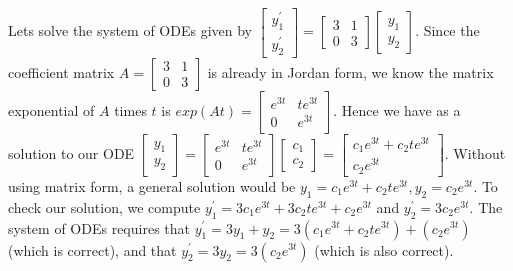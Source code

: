 \documentclass[10pt]{article}
\theoremstyle{plain}
\theoremstyle{box}
\begin{document}
Lets solve the system of ODEs given by  
$
\begin{bmatrix}
y_1^\prime\\
y_2^\prime
\end{bmatrix}
=
\begin{bmatrix}
3&1\\
0&3
\end{bmatrix}
\begin{bmatrix}
y_1\\
y_2
\end{bmatrix}
$. Since the coefficient matrix $A = \begin{bmatrix}
3&1\\
0&3
\end{bmatrix}
$ is already in Jordan form, we know the matrix exponential of $A$ times $t$ is 
$exp(At) = 
\begin{bmatrix}
e^{3t}&te^{3t}\\
0&e^{3t}
\end{bmatrix}
$.  Hence we have as a solution to our ODE 
$
\begin{bmatrix}
y_1\\
y_2
\end{bmatrix}
=
\begin{bmatrix}
e^{3t}&te^{3t}\\
0&e^{3t}
\end{bmatrix}
\begin{bmatrix}
c_1\\
c_2
\end{bmatrix}
=
\begin{bmatrix}
c_1e^{3t}+c_2te^{3t}\\
c_2e^{3t}
\end{bmatrix}$. Without using matrix form, a general solution would be $y_1=c_1e^{3t}+c_2te^{3t}, y_2=c_2e^{3t}$.  To check our solution, we compute $y_1^\prime = 3c_1e^{3t}+3c_2te^{3t}+c_2e^{3t}$ and $y_2^\prime = 3c_2e^{3t}$.  The system of ODEs requires that $y_1^\prime = 3y_1+y_2 = 3(c_1e^{3t}+c_2te^{3t})+(c_2e^{3t})$ (which is correct), and that $y_2^\prime = 3y_2 = 3(c_2e^{3t})$ (which is also correct). 
\end{document}
